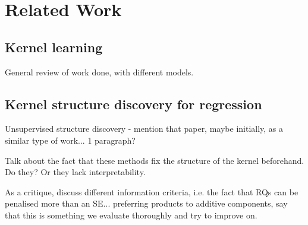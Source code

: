 \documentclass[a4paper,12pt ]{report}
\begin{document}
\clearpage

\chapter{Related Work} 

\section{Kernel learning}

General review of work done, with different models.

\section{Kernel structure discovery for regression}

Unsupervised structure discovery - mention that paper, maybe initially, as a similar type of work... 1 paragraph? 

Talk about the fact that these methods fix the structure of the kernel beforehand. Do they? Or they lack interpretability.





As a critique, discuss different information criteria, i.e. the fact that RQs can be penalised more than an SE... preferring products to additive components, say that this is something we evaluate thoroughly and try to improve on. 
\end{document}

